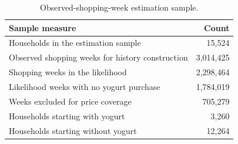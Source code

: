 \begin{table}[htbp]
\centering\small
\caption{Observed-shopping-week estimation sample.}
\label{tab:weekly-sample}
\begin{tabular}{lr}
\toprule
Sample measure & Count \\
\midrule
Households in the estimation sample & 15,524 \\
Observed shopping weeks for history construction & 3,014,425 \\
Shopping weeks in the likelihood & 2,298,464 \\
Likelihood weeks with no yogurt purchase & 1,784,019 \\
Weeks excluded for price coverage & 705,279 \\
Households starting with yogurt & 3,260 \\
Households starting without yogurt & 12,264 \\
\bottomrule
\end{tabular}
\end{table}
